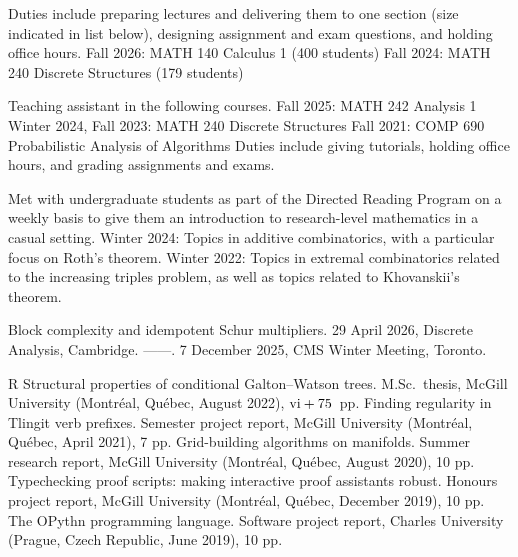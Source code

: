 \goodbreak
{}

\smallskip
Duties include preparing lectures and delivering them to one section (size indicated in list below),
designing assignment and exam questions, and holding office hours.
\begingroup\parindent=10pt
\smallskip
\thing Fall 2026: MATH 140 Calculus 1 (400 students)
\smallskip
\thing Fall 2024: MATH 240 Discrete Structures (179 students)
\endgroup
\medbreak

\smallskip
Teaching assistant in the following courses.
\begingroup\parindent=10pt
\smallskip
\thing Fall 2025: MATH 242 Analysis 1
\smallskip
\thing Winter 2024, Fall 2023: MATH 240 Discrete Structures
\smallskip
\thing Fall 2021: COMP 690 Probabilistic Analysis of Algorithms
\endgroup
\smallskip
Duties include giving tutorials, holding office hours, and
grading assignments and exams.
\medbreak

\smallskip
Met with undergraduate students as part of the Directed Reading Program
on a weekly basis to give them an introduction to research-level
mathematics in a casual setting.
\begingroup\parindent=10pt
\smallskip
\thing Winter 2024: Topics in additive combinatorics, with a particular focus on Roth's theorem.
\smallskip
\thing Winter 2022: Topics in extremal combinatorics related to the increasing
triples problem, as well as topics related to Khovanskii's theorem.
\endgroup
\medbreak

\goodbreak
{}

\begingroup\frenchspacing\parindent=10pt
\thing Block complexity and idempotent Schur multipliers. 29 April 2026, Discrete Analysis, Cambridge.
\smallskip
\thing ------. 7 December 2025, CMS Winter Meeting, Toronto.
\endgroup

\goodbreak
{}

\pubbegin R
\repitem Structural properties of conditional Galton--Watson trees. M.Sc.~thesis, McGill University
(Montr\'eal, Qu\'ebec, August 2022), $\hbox{\rm vi} + 75$~pp.
\repitem Finding regularity in Tlingit verb prefixes. Semester project report, McGill University
(Montr\'eal, Qu\'ebec, April 2021), 7 pp.
\repitem Grid-building algorithms on manifolds. Summer research report, McGill University (Montr\'eal, Qu\'ebec,
August 2020), 10 pp.
\repitem Typechecking proof scripts: making interactive proof assistants robust.
Honours project report, McGill University (Montr\'eal, Qu\'ebec, December 2019), 10 pp.
\repitem The OPythn programming language. Software project report, Charles University (Prague,
Czech Republic, June 2019), 10 pp.

